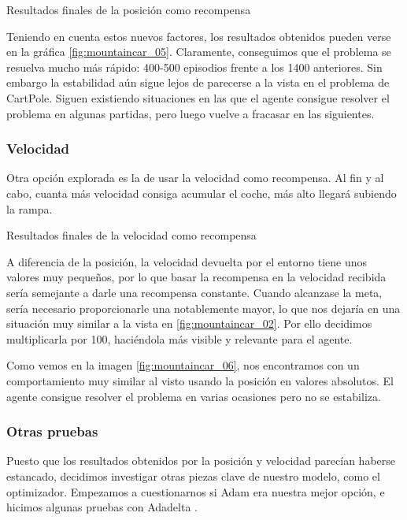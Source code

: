 %
       {Resultados finales de la posición como recompensa}

Teniendo en cuenta estos nuevos factores, los resultados obtenidos pueden verse en la gráfica \ref{fig:mountaincar_05}. Claramente, conseguimos que el problema se resuelva mucho más rápido: 400-500 episodios frente a los 1400 anteriores.  Sin embargo la estabilidad aún sigue lejos de parecerse a la vista en el problema de CartPole. Siguen existiendo situaciones en las que el agente consigue resolver el problema en algunas partidas, pero luego vuelve a fracasar en las siguientes.


\subsubsection*{Velocidad}

Otra opción explorada es la de usar la velocidad como recompensa. Al fin y al cabo, cuanta más velocidad consiga acumular el coche, más alto llegará subiendo la rampa.

%
       {Resultados finales de la velocidad como recompensa}

A diferencia de la posición, la velocidad devuelta por el entorno tiene unos valores muy pequeños, por lo que basar la recompensa en la velocidad recibida sería semejante a darle una recompensa constante. Cuando alcanzase la meta, sería necesario proporcionarle una notablemente mayor, lo que nos dejaría en una situación muy similar a la vista en \ref{fig:mountaincar_02}. Por ello decidimos multiplicarla por 100, haciéndola más visible y relevante para el agente. 

Como vemos en la imagen \ref{fig:mountaincar_06}, nos encontramos con un comportamiento muy similar al visto usando la posición en valores absolutos. El agente consigue resolver el problema en varias ocasiones pero no se estabiliza.



\subsubsection*{Otras pruebas}

Puesto que los resultados obtenidos por la posición y velocidad parecían haberse estancado, decidimos investigar otras piezas clave de nuestro modelo, como el optimizador. Empezamos a cuestionarnos si Adam \citep{kingma2014adam} era nuestra mejor opción, e hicimos algunas pruebas con Adadelta \citep{NIPS2017_7003}.


